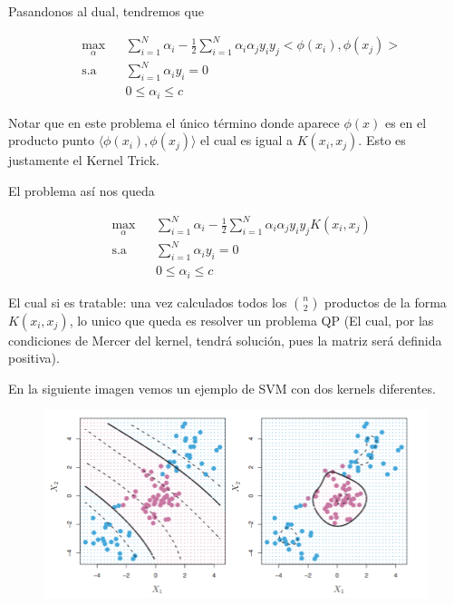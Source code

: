Pasandonos al dual, tendremos que

\begin{equation*}
\begin{aligned}
& \underset{\alpha}{\text{max}}
& & \sum\limits_{i=1}^{N}\alpha_i - \frac{1}{2} \sum\limits_{i=1}^{N} \alpha_i \alpha_j y_i y_j <\phi(x_i), \phi(x_j)>\\
& \text{s.a}
& & \sum\limits_{i=1}^{N} \alpha_i y_i= 0 \\
& &  &0 \leq \alpha_i \leq c
\end{aligned}
\end{equation*}

Notar que en este problema el único término donde aparece $\phi(x)$ es en el producto punto $\langle \phi(x_i), \phi(x_j)\rangle$ el cual es igual a $K(x_i,x_j)$. Esto es justamente el Kernel Trick.

El problema así nos queda

\begin{equation*}
\begin{aligned}
& \underset{\alpha}{\text{max}}
& & \sum\limits_{i=1}^{N}\alpha_i - \frac{1}{2} \sum\limits_{i=1}^{N} \alpha_i \alpha_j y_i y_j K(x_i, x_j)\\
& \text{s.a}
& & \sum\limits_{i=1}^{N} \alpha_i y_i= 0 \\
& &  &0 \leq \alpha_i \leq c
\end{aligned}
\end{equation*}

El cual si es tratable: una vez calculados todos los $\binom{n}{2}$ productos de la forma $K(x_i, x_j)$, lo unico que queda es resolver un problema QP (El cual, por las condiciones de Mercer del kernel, tendrá solución, pues la matriz será definida positiva). 

En la siguiente imagen vemos un ejemplo de SVM con dos kernels diferentes.

\begin{figure}[ht]
    \centering
    \includegraphics[scale=0.8]{img/svmejemlos.png}
\end{figure}

